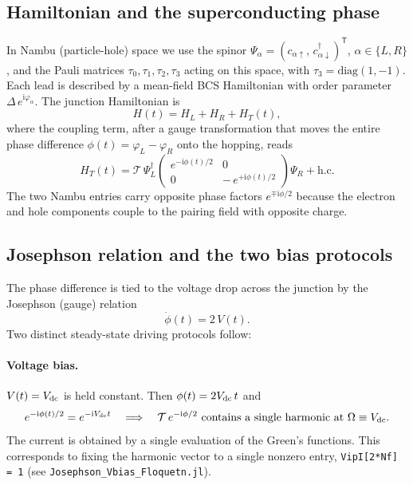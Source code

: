 \documentclass[11pt,a4paper]{article}
\newcommand{\ii}{\mathrm{i}}
\begin{document}
\subsection{Hamiltonian and the superconducting phase}

In Nambu (particle-hole) space we use the spinor
$\Psi_\alpha=(c_{\alpha\uparrow},\,c^\dagger_{\alpha\downarrow})^{\mathsf T}$,
$\alpha\in\{L,R\}$, and the Pauli matrices $\tau_0,\tau_1,\tau_2,\tau_3$ acting
on this space, with $\tau_3=\mathrm{diag}(1,-1)$.  Each lead is described by a
mean-field BCS Hamiltonian with order parameter $\Delta\,e^{\ii\varphi_\alpha}$.
The junction Hamiltonian is
\begin{equation}
  H(t) = H_L + H_R + H_T(t),
\end{equation}
where the coupling term, after a gauge transformation that moves the entire
phase difference $\phi(t)=\varphi_L-\varphi_R$ onto the hopping, reads
\begin{equation}
  H_T(t) = \mathcal{T}\,
  \Psi_L^\dagger
  \begin{pmatrix}
     e^{-\ii\phi(t)/2} & 0\\[2pt]
     0 & -\,e^{+\ii\phi(t)/2}
  \end{pmatrix}
  \Psi_R + \text{h.c.}
  \label{eq:HT}
\end{equation}
The two Nambu entries carry opposite phase factors $e^{\mp\ii\phi/2}$ because
the electron and hole components couple to the pairing field with opposite
charge.

\subsection{Josephson relation and the two bias protocols}
\label{sec:bias}

The phase difference is tied to the voltage drop across the junction by the
Josephson (gauge) relation
\begin{equation}
  \dot\phi(t) = 2\,V(t).
  \label{eq:josephson}
\end{equation}
Two distinct steady-state driving protocols follow:

\paragraph{Voltage bias.}
$V(t)=V_{\rm dc}$ is held constant.  Then $\phi(t)=2V_{\rm dc}\,t$ and
\begin{equation}
  e^{-\ii\phi(t)/2} = e^{-\ii V_{\rm dc} t}
  \quad\Longrightarrow\quad
  \mathcal{T}\,e^{-\ii\phi/2}\ \text{contains a single harmonic at}\ \Omega\equiv V_{\rm dc}.
  \label{eq:vbias_phase}
\end{equation}
The current is obtained by a single evaluation of the Green's functions.
This corresponds to fixing the harmonic vector to a single nonzero entry,
\verb|VipI[2*Nf] = 1| (see \texttt{Josephson\_Vbias\_Floquetn.jl}).
\end{document}
